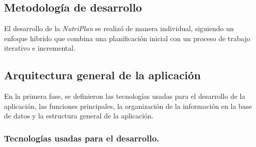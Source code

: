 \documentclass[12pt,a4paper]{report} %
\begin{document}
	
	
	\subsection*{Metodología de desarrollo}
	El desarrollo de la \textit{NutriPlan} se realizó de manera individual, siguiendo un enfoque hibrido que combina una planificación inicial con un proceso de trabajo iterativo e incremental.

	\subsection*{Arquitectura general de la aplicación}
	
	En la primera fase, se definieron las tecnologías usadas para el desarrollo de la aplicación, las funciones principales, la organización de la información en la base de datos y la estructura general de la aplicación.
	
	\subsubsection*{Tecnologías usadas para el desarrollo.}
\end{document}
